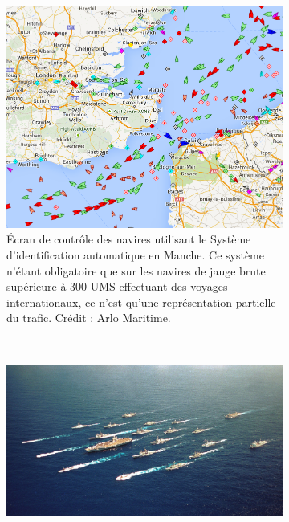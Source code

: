 	
	
	
	\begin{figure}[htbp]
		\begin{subfigure}[t]{0.40\textwidth}
			\centering
			\includegraphics[width=\textwidth]{figures/ch1/channel}
			\caption[Écran de contrôle maritime en Manche (SIA)]{Écran de contrôle des navires utilisant le Système d'identification automatique en Manche. Ce système n'étant obligatoire que sur les navires de jauge brute supérieure à 300 UMS effectuant des voyages internationaux, ce n'est qu'une représentation partielle du trafic. Crédit : Arlo Maritime.}
			\label{fig:channel}
		\end{subfigure}
		~
		\begin{subfigure}[t]{0.58\textwidth}
			\centering
			\includegraphics[width=\textwidth]{figures/ch1/lincoln}

\end{subfigure}
\end{figure}
